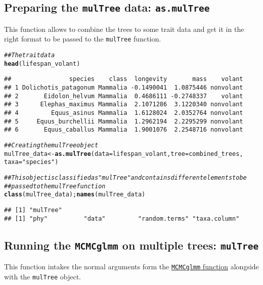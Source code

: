 \documentclass{article}\usepackage[]{graphicx}\usepackage[]{color}
\makeatletter
\newcommand{\hlstr}[1]{\textcolor[rgb]{0.192,0.494,0.8}{#1}}%
\newcommand{\hlcom}[1]{\textcolor[rgb]{0.678,0.584,0.686}{\textit{#1}}}%
\newcommand{\hlstd}[1]{\textcolor[rgb]{0.345,0.345,0.345}{#1}}%
\newcommand{\hlkwb}[1]{\textcolor[rgb]{0.69,0.353,0.396}{#1}}%
\newcommand{\hlkwc}[1]{\textcolor[rgb]{0.333,0.667,0.333}{#1}}%
\newcommand{\hlkwd}[1]{\textcolor[rgb]{0.737,0.353,0.396}{\textbf{#1}}}%
\newenvironment{kframe}{%
 \def\at@end@of@kframe{}%
 \ifinner\ifhmode%
  \def\at@end@of@kframe{\end{minipage}}%
  \begin{minipage}{\columnwidth}%
 \fi\fi%
 \def\FrameCommand##1{\hskip\@totalleftmargin \hskip-\fboxsep
 \colorbox{shadecolor}{##1}\hskip-\fboxsep
     \hskip-\linewidth \hskip-\@totalleftmargin \hskip\columnwidth}%
 \MakeFramed {\advance\hsize-\width
   \@totalleftmargin\z@ \linewidth\hsize
   \@setminipage}}%
 {\par\unskip\endMakeFramed%
 \at@end@of@kframe}
\newenvironment{knitrout}{}{} %
\makeatother
\begin{document}
\subsection{Preparing the \texttt{mulTree} data: \texttt{as.mulTree}}
This function allows to combine the trees to some trait data and get it in the right format to be passed to the \texttt{mulTree} function.

\begin{knitrout}
\color{fgcolor}\begin{kframe}
\begin{alltt}
\hlcom{## The trait data}
\hlkwd{head}\hlstd{(lifespan_volant)}
\end{alltt}
\begin{verbatim}
##                species    class  longevity       mass    volant
## 1 Dolichotis_patagonum Mammalia -0.1490041  1.0875446 nonvolant
## 2       Eidolon_helvum Mammalia  0.4686111 -0.2748337    volant
## 3      Elephas_maximus Mammalia  2.1071286  3.1220340 nonvolant
## 4         Equus_asinus Mammalia  1.6128024  2.0352764 nonvolant
## 5     Equus_burchellii Mammalia  1.2962194  2.2295299 nonvolant
## 6       Equus_caballus Mammalia  1.9001076  2.2548716 nonvolant
\end{verbatim}
\begin{alltt}
\hlcom{## Creating the mulTree object}
\hlstd{mulTree_data} \hlkwb{<-} \hlkwd{as.mulTree}\hlstd{(}\hlkwc{data} \hlstd{= lifespan_volant,} \hlkwc{tree} \hlstd{= combined_trees,}
    \hlkwc{taxa} \hlstd{=} \hlstr{"species"}\hlstd{)}

\hlcom{## This object is classified as "mulTree" and contains different elements to be}
\hlcom{## passed to the mulTree function}
\hlkwd{class}\hlstd{(mulTree_data) ;} \hlkwd{names}\hlstd{(mulTree_data)}
\end{alltt}
\begin{verbatim}
## [1] "mulTree"
## [1] "phy"          "data"         "random.terms" "taxa.column"
\end{verbatim}
\end{kframe}
\end{knitrout}


\subsection{Running the \texttt{MCMCglmm} on multiple trees: \texttt{mulTree}}
This function intakes the normal arguments form the \href{http://cran.r-project.org/web/packages/MCMCglmm/index.html}{\texttt{MCMCglmm} function} alongside with the \texttt{mulTree} object.
\end{document}
